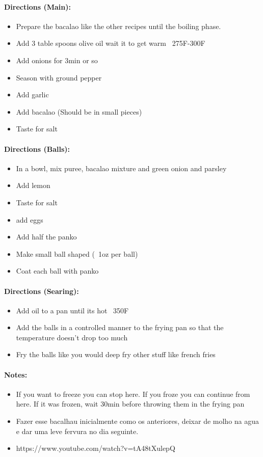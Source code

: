 \documentclass{article}
\begin{document}
\paragraph{Directions (Main):}
\begin{itemize}
	\item Prepare the bacalao like the other recipes until the boiling phase.
	\item Add 3 table spoons olive oil wait it to get warm ~275F-300F
	\item Add onions for 3min or so
	\item Season with ground pepper
	\item Add garlic
	\item Add bacalao (Should be in small pieces)
	\item Taste for salt
\end{itemize}

\paragraph{Directions (Balls):}
\begin{itemize}
	\item In a bowl, mix puree, bacalao mixture and green onion and parsley
	\item Add lemon
	\item Taste for salt
	\item add  eggs
	\item Add half the panko 
	\item Make small ball shaped (~1oz per ball)
	\item Coat each ball with panko
\end{itemize}

\paragraph{Directions (Searing):}
\begin{itemize}
	\item Add oil to a pan until its hot ~350F
	\item Add the balls in a controlled manner to the frying pan so that the temperature doesn't drop too much
	\item Fry the balls like you would deep fry other stuff like french fries
\end{itemize}

\paragraph{Notes:}
\begin{itemize}
	\item If you want to freeze you can stop here. If you froze you can continue from here. If it was frozen, wait 30min before throwing them in the frying pan
	\item Fazer esse bacalhau inicialmente como os anteriores, deixar de molho na agua e dar uma leve fervura no dia seguinte.
	\item https://www.youtube.com/watch?v=tA48tXulepQ
\end{itemize}
\end{document}
